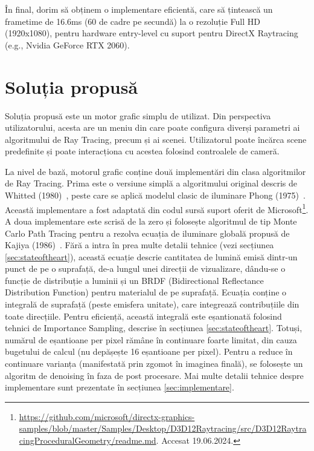 \documentclass[12pt,a4paper]{report}
\numberwithin{equation}{section} %
\begin{document}
În final, dorim să obținem o implementare eficientă, care să țintească un frametime de 16.6ms
(60 de cadre pe secundă) la o rezoluție Full HD (1920x1080), pentru hardware entry-level cu suport pentru
DirectX Raytracing (e.g., Nvidia GeForce RTX 2060).

\section{Soluția propusă}
Soluția propusă este un motor grafic simplu de utilizat. Din perspectiva utilizatorului,
acesta are un meniu din care poate configura diverși parametri ai algoritmului
de Ray Tracing, precum și ai scenei. Utilizatorul poate încărca scene predefinite
și poate interacționa cu acestea folosind controalele de cameră.

La nivel de bază, motorul grafic conține două implementări din clasa algoritmilor
de Ray Tracing. Prima este o versiune simplă a algoritmului original descris de
Whitted (1980)~\cite{Whitted}, peste care se aplică modelul clasic de iluminare
Phong (1975)~\cite{Phong}. Această implementare a fost adaptată din codul sursă
suport oferit de Microsoft\footnote{\url{https://github.com/microsoft/directx-graphics-samples/blob/master/Samples/Desktop/D3D12Raytracing/src/D3D12RaytracingProceduralGeometry/readme.md}. Accesat 19.06.2024.}.
A doua implementare este scrisă de la zero și folosește algoritmul de tip Monte Carlo
Path Tracing pentru a rezolva ecuația de iluminare globală propusă de Kajiya (1986)~\cite{Kajiya}.
Fără a intra în prea multe detalii tehnice (vezi secțiunea \ref{sec:stateoftheart}),
această ecuație descrie cantitatea de lumină emisă dintr-un punct de pe o suprafață,
de-a lungul unei direcții de vizualizare, dându-se o funcție de distribuție a luminii
și un BRDF (Bidirectional Reflectance Distribution Function) pentru materialul de pe
suprafață. Ecuația conține o integrală de suprafață (peste emisfera unitate), care
integrează contribuțiile din toate direcțiile. Pentru eficiență, această integrală
este eșantionată folosind tehnici de Importance Sampling, descrise în secțiunea \ref{sec:stateoftheart}.
Totuși, numărul de eșantioane per pixel rămâne în continuare foarte limitat, din
cauza bugetului de calcul (nu depășește 16 eșantioane per pixel). Pentru a reduce
în continuare varianța (manifestată prin zgomot în imaginea finală), se folosește
un algoritm de denoising în faza de post procesare. Mai multe detalii tehnice
despre implementare sunt prezentate în secțiunea \ref{sec:implementare}.
\end{document}
